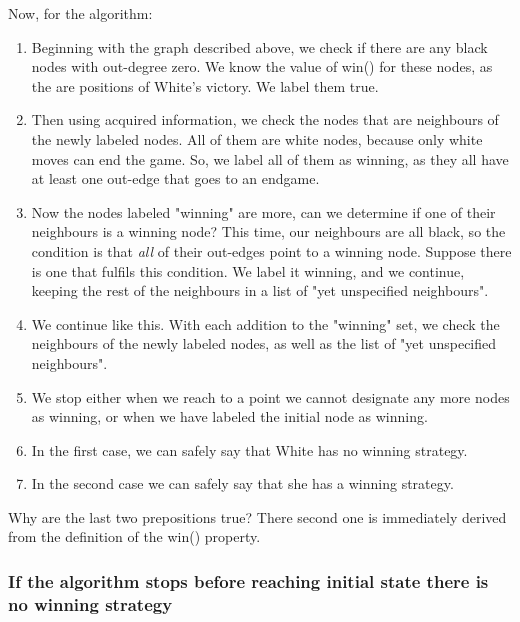 Now, for the algorithm:

\begin{enumerate}
\item
Beginning with the graph described above, we check if there are any black nodes with out-degree zero. We know the value of win() for these nodes,
as the are positions of White's victory. We label them true. 
\item Then using
acquired information, we check the nodes that are neighbours of the newly labeled nodes. All of them are white nodes, because only white moves can end the
game. So, we label all of them as winning, as they all have at least one 
out-edge that goes to an endgame.
\item  Now the nodes labeled "winning" are more, can we determine if one of their neighbours is a winning node? This time, our neighbours are all black, so the condition is that \emph{all} of their out-edges point to a winning node. Suppose
there is one that fulfils this condition. We label it winning, and we continue,
keeping the rest of the neighbours in a list of "yet unspecified neighbours".
\item We continue like this. With each addition to the "winning" set, we check the neighbours of the
newly labeled nodes, as well as the list of "yet unspecified neighbours". 
\item We stop either when  we reach to a point we cannot 
designate any more nodes as winning, or when we have labeled the initial node
as winning. 
\item In the first case, we can safely say that White has no winning strategy.
\item In the second case we can safely say that she has a winning strategy.
\end{enumerate}

Why are the last two prepositions true? There second one is immediately derived
from the definition of the win() property. 
\subsubsection*{If the algorithm stops before reaching initial state there
is no winning strategy}

